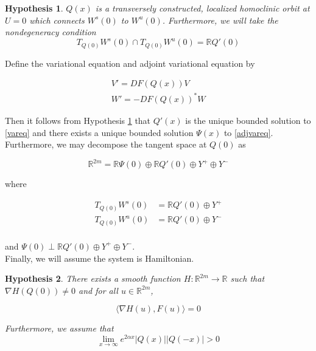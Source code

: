 \documentclass[12pt]{article}
\def\R{{\mathbb R}}
\newtheorem{hypothesis}{Hypothesis}
\begin{document}
\begin{hypothesis}\label{transverseQ}
$Q(x)$ is a transversely constructed, localized homoclinic orbit at $U = 0$ which connects $W^s(0)$ to $W^u(0)$. Furthermore, we will take the nondegeneracy condition
\begin{equation}
T_{Q(0)}W^s(0) \cap T_{Q(0)}W^u(0) = \R Q'(0)
\end{equation}
\end{hypothesis}

Define the variational equation and adjoint variational equation by

\begin{align}
V' = DF(Q(x))V \label{vareq} \\
W' = -DF(Q(x))^* W \label{adjvareq}
\end{align}

Then it follows from Hypothesis \ref{transverseQ} that $Q'(x)$ is the unique bounded solution to \eqref{vareq} and there exists a unique bounded solution $\Psi(x)$ to \eqref{adjvareq}. Furthermore, we may decompose the tangent space at $Q(0)$ as 

\begin{equation}
\R^{2m} = \R \Psi(0) \oplus \R Q'(0) \oplus Y^+ \oplus Y^-
\end{equation}

where

\begin{align*}
T_{Q(0)}W^s(0) &= \R Q'(0) \oplus Y^+ \\
T_{Q(0)}W^u(0) &= \R Q'(0) \oplus Y^- \\
\end{align*}

and $\Psi(0) \perp \R Q'(0) \oplus Y^+ \oplus Y^-$.\\

Finally, we will assume the system is Hamiltonian.

\begin{hypothesis}\label{Hhyp}
There exists a smooth function $H: \R^{2m} \rightarrow \R$ such that $\nabla H(Q(0)) \neq 0$ and for all $u \in \R^{2m}$,

\begin{equation}
\langle \nabla H(u), F(u) \rangle = 0
\end{equation}

Furthermore, we assume that
\begin{equation*}
\lim_{x \rightarrow \infty} e^{2 \alpha x}|Q(x)||Q(-x)| > 0
\end{equation*}
\end{hypothesis}
\end{document}
